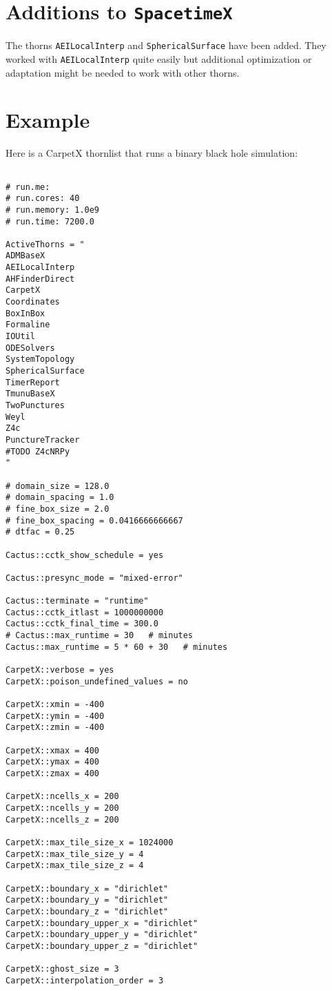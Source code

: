 \section{Additions to \texttt{SpacetimeX}}
The thorns \texttt{AEILocalInterp} and \texttt{SphericalSurface} have been added. They worked with \texttt{AEILocalInterp} quite easily but additional optimization or adaptation might be needed to work with other thorns.

\section{Example}
Here is a CarpetX thornlist that runs a binary black hole simulation:

\begin{verbatim}

# run.me:
# run.cores: 40
# run.memory: 1.0e9
# run.time: 7200.0

ActiveThorns = "
ADMBaseX
AEILocalInterp
AHFinderDirect
CarpetX
Coordinates
BoxInBox
Formaline
IOUtil
ODESolvers
SystemTopology
SphericalSurface
TimerReport
TmunuBaseX
TwoPunctures
Weyl
Z4c
PunctureTracker
#TODO Z4cNRPy
"

# domain_size = 128.0
# domain_spacing = 1.0
# fine_box_size = 2.0
# fine_box_spacing = 0.0416666666667
# dtfac = 0.25

Cactus::cctk_show_schedule = yes

Cactus::presync_mode = "mixed-error"

Cactus::terminate = "runtime"
Cactus::cctk_itlast = 1000000000
Cactus::cctk_final_time = 300.0
# Cactus::max_runtime = 30   # minutes
Cactus::max_runtime = 5 * 60 + 30   # minutes

CarpetX::verbose = yes
CarpetX::poison_undefined_values = no

CarpetX::xmin = -400
CarpetX::ymin = -400
CarpetX::zmin = -400

CarpetX::xmax = 400
CarpetX::ymax = 400
CarpetX::zmax = 400

CarpetX::ncells_x = 200
CarpetX::ncells_y = 200
CarpetX::ncells_z = 200

CarpetX::max_tile_size_x = 1024000
CarpetX::max_tile_size_y = 4
CarpetX::max_tile_size_z = 4

CarpetX::boundary_x = "dirichlet"
CarpetX::boundary_y = "dirichlet"
CarpetX::boundary_z = "dirichlet"
CarpetX::boundary_upper_x = "dirichlet"
CarpetX::boundary_upper_y = "dirichlet"
CarpetX::boundary_upper_z = "dirichlet"

CarpetX::ghost_size = 3
CarpetX::interpolation_order = 3


\end{verbatim}
